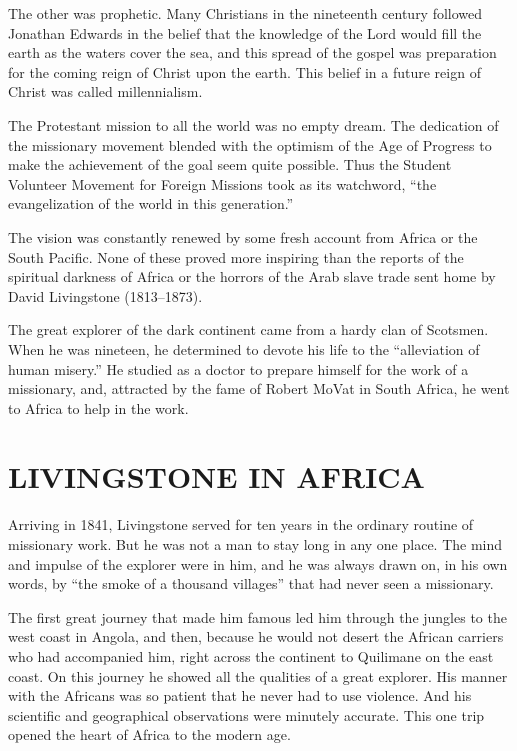 The other was prophetic. Many Christians in the nineteenth century followed Jonathan Edwards in the
belief that the knowledge of the Lord would fill the earth as the waters cover the sea, and this
spread of the gospel was preparation for the coming reign of Christ upon the earth. This belief in a
future reign of Christ was called millennialism.

The Protestant mission to all the world was no empty dream. The dedication of the missionary
movement blended with the optimism of the Age of Progress to make the achievement of the goal seem
quite possible. Thus the Student Volunteer Movement for Foreign Missions took as its watchword, “the
evangelization of the world in this generation.”

The vision was constantly renewed by some fresh account from Africa or the South Pacific. None of
these proved more inspiring than the reports of the spiritual darkness of Africa or the horrors of
the Arab slave trade sent home by David Livingstone (1813–1873).

The great explorer of the dark continent came from a hardy clan of Scotsmen. When he was nineteen,
he determined to devote his life to the “alleviation of human misery.” He studied as a doctor to
prepare himself for the work of a missionary, and, attracted by the fame of Robert MoVat in South
Africa, he went to Africa to help in the work.

\section{LIVINGSTONE IN AFRICA}

Arriving in 1841, Livingstone served for ten years in the ordinary routine of missionary work. But
he was not a man to stay long in any one place. The mind and impulse of the explorer were in him,
and he was always drawn on, in his own words, by “the smoke of a thousand villages” that had never
seen a missionary.

The first great journey that made him famous led him through the jungles to the west coast in
Angola, and then, because he would not desert the African carriers who had accompanied him, right
across the continent to Quilimane on the east coast. On this journey he showed all the qualities of
a great explorer. His manner with the Africans was so patient that he never had to use violence. And
his scientific and geographical observations were minutely accurate. This one trip opened the heart
of Africa to the modern age.

